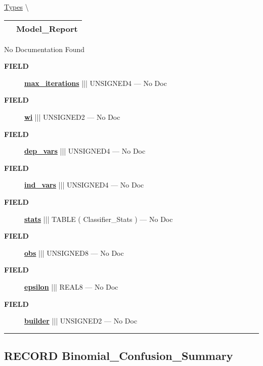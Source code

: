 \hypertarget{ecldoc:logisticregression.types.model_report}{}
\hspace{0pt} \hyperlink{ecldoc:LogisticRegression.Types}{Types} \textbackslash 

{\renewcommand{\arraystretch}{1.5}
\begin{tabularx}{\textwidth}{|>{\raggedright\arraybackslash}l|X|}
\hline
\hspace{0pt}\mytexttt{\color{red} } & \textbf{Model\_Report} \\
\hline
\end{tabularx}
}

\par





No Documentation Found







\par
\begin{description}
\item [\colorbox{tagtype}{\color{white} \textbf{\textsf{FIELD}}}] \textbf{\underline{max\_iterations}} ||| UNSIGNED4 --- No Doc
\item [\colorbox{tagtype}{\color{white} \textbf{\textsf{FIELD}}}] \textbf{\underline{wi}} ||| UNSIGNED2 --- No Doc
\item [\colorbox{tagtype}{\color{white} \textbf{\textsf{FIELD}}}] \textbf{\underline{dep\_vars}} ||| UNSIGNED4 --- No Doc
\item [\colorbox{tagtype}{\color{white} \textbf{\textsf{FIELD}}}] \textbf{\underline{ind\_vars}} ||| UNSIGNED4 --- No Doc
\item [\colorbox{tagtype}{\color{white} \textbf{\textsf{FIELD}}}] \textbf{\underline{stats}} ||| TABLE ( Classifier\_Stats ) --- No Doc
\item [\colorbox{tagtype}{\color{white} \textbf{\textsf{FIELD}}}] \textbf{\underline{obs}} ||| UNSIGNED8 --- No Doc
\item [\colorbox{tagtype}{\color{white} \textbf{\textsf{FIELD}}}] \textbf{\underline{epsilon}} ||| REAL8 --- No Doc
\item [\colorbox{tagtype}{\color{white} \textbf{\textsf{FIELD}}}] \textbf{\underline{builder}} ||| UNSIGNED2 --- No Doc
\end{description}





\rule{\linewidth}{0.5pt}
\subsection*{\textsf{\colorbox{headtoc}{\color{white} RECORD}
Binomial\_Confusion\_Summary}}

